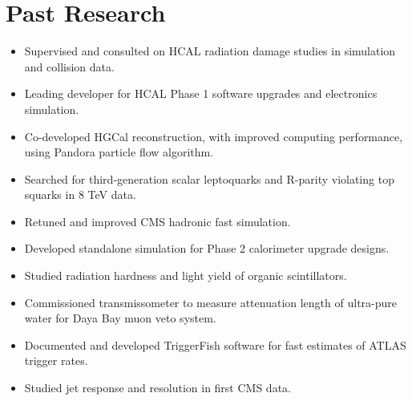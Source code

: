 \section{Past Research}
\begin{itemize}[leftmargin=12pt]
\item Supervised and consulted on HCAL radiation damage studies in simulation and collision data.
\item Leading developer for HCAL Phase 1 software upgrades and electronics simulation.
\item Co-developed HGCal reconstruction, with improved computing performance, using Pandora particle flow algorithm.
\item Searched for third-generation scalar leptoquarks and R-parity violating top squarks in 8 TeV data.
\item Retuned and improved CMS hadronic fast simulation.
\item Developed standalone simulation for Phase 2 calorimeter upgrade designs.
\item Studied radiation hardness and light yield of organic scintillators.
\item Commissioned transmissometer to measure attenuation length of ultra-pure water for Daya Bay muon veto system.
\item Documented and developed TriggerFish software for fast estimates of ATLAS trigger rates.
\item Studied jet response and resolution in first CMS data.
\end{itemize}
